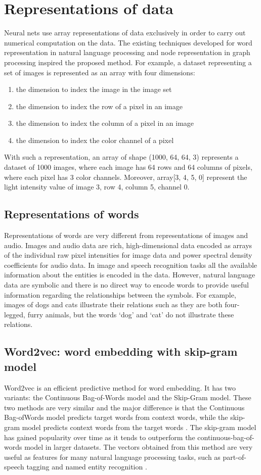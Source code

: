 \documentclass[12pt]{WSUThesis}
\theoremstyle{definition}
\begin{document}
\section{Representations of data}
Neural nets use array representations of data exclusively in order to carry out numerical computation on the data.
The existing techniques developed for word representation in natural language processing and node representation in graph processing inspired the proposed method.
For example, a dataset representing a set of images is represented as an array with four dimensions:
\begin{enumerate}
	\item the dimension to index the image in the image set
	\item the dimension to index the row of a pixel in an image
	\item the dimension to index the column of a pixel in an image
	\item the dimension to index the color channel of a pixel
\end{enumerate}
With such a representation, an array of shape (1000, 64, 64, 3) represents a dataset of 1000 images, where each image has 64 rows and 64 columns of pixels, where each pixel has 3 color channels.
Moreover, array[3, 4, 5, 0] represent the light intensity value of image 3, row 4, column 5, channel 0.

\subsection{Representations of words}
Representations of words are very different from representations of images and audio.
Images and audio data are rich, high-dimensional data encoded as arrays of the individual raw pixel intensities for image data and power spectral density coefficients for audio data.
In image and speech recognition tasks all the available information about the entities is encoded in the data.
However, natural language data are symbolic and there is no direct way to encode words to provide useful information regarding the relationships between the symbols.
For example, images of dogs and cats illustrate their relations such as they are both four-legged, furry animals, but the words `dog' and `cat' do not illustrate these relations.

\subsection{Word2vec: word embedding with skip-gram model}
Word2vec is an efficient predictive method for word embedding. It has two variants: the Continuous Bag-of-Words model and the Skip-Gram model.
These two methods are very similar and the major difference is that the Continuous Bag-ofWords model predicts target words from context words, while the skip-gram model predicts context words from the target words \cite{levy2014dependency}.
The skip-gram model has gained popularity over time as it tends to outperform the continuous-bag-of-words model in larger datasets.
The vectors obtained from this method are very useful as features for many natural language processing tasks, such as part-of-speech tagging \cite{collobert2011natural} and named entity recognition \cite{turian2010word}.
\end{document}
